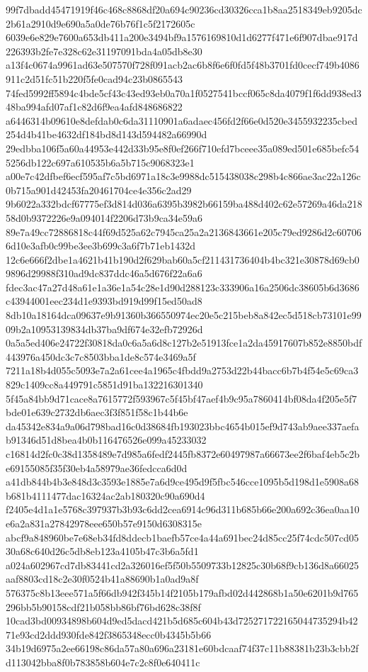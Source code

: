 \documentclass[11pt,a4paper]{article}
\begin{document}
{99f7dbadd45471919f46c468c8868df20a694c90236cd30326cca1b8aa2518349eb9205dc2b61a2910d9e690a5a0de76b76f1c5f2172605c
6039e6e829e7600a653db411a200e3494bf9a1576169810d1d6277f471e6f907dbae917d226393b2fe7e328c62e31197091bda4a05db8e30
a13f4c0674a9961ad63e507570f728f091acb2ac6b8f6e6f0fd5f48b3701fd0cecf749b4086911c2d51fc51b220f5fe0cad94c23b0865543
74fed5992ff5894c4bde5cf43c43ed93eb0a70a1f0527541bccf065c8da4079f1f6dd938ed348ba994afd07af1c82d6f9ea4afd848686822
a6446314b09610e8defdab0c6da31110901a6adaec456fd2f66e0d520e3455932235cbed254d4b41be4632df184bd8d143d594482a66990d
29edbba106f5a60a44953e442d33b95e8f0ef266f710efd7bceee35a089ed501e685befc545256db122c697a610535b6a5b715c9068323e1
a00e7c42dfbef6ecf595af7c5bd6971a18c3e9988dc515438038c298b4c866ae3ac22a126c0b715a901d42453fa20461704ce4e356c2ad29
9b6022a332bdcf67775ef3d814d036a6395b3982b66159ba488d402c62e57269a46da21858d0b9372226e9a094014f2206d73b9ca34e59a6
89e7a49cc72886818c44f69d525a62c7945ca25a2a2136843661e205c79ed9286d2c607066d10e3afb0c99be3ee3b699c3a6f7b71eb1432d
12c6e666f2dbe1a4621b41b190d2f629bab60a5cf211431736404b4bc321e30878d69cb09896d29988f310ad9dc837ddc46a5d676f22a6a6
fdec3ac47a27d48a61e1a36e1a54c28e1d90d288123c333906a16a2506dc38605b6d3686c43944001eec234d1e9393bd919d99f15ed50ad8
8db10a18164dca09637e9b91360b366550974ec20e5c215beb8a842ec5d518cb73101e9909b2a10953139834db37ba9df674e32efb72926d
0a5a5ed406e24722f30818da0c6a5a6d8c127b2e51913fce1a2da45917607b852e8850bdf443976a450dc3c7c8503bba1de8c574e3469a5f
7211a18b4d055c5093e7a2a61cee4a1965c4fbdd9a2753d22b44bacc6b7b4f54e5c69ca3829c1409cc8a449791c5851d91ba132216301340
5f45a84bb9d71cace8a7615772f593967c5f45bf47aef4b9c95a7860414bf08da4f205e5f7bde01e639c2732db6aec3f3f851f58c1b44b6e
da45342e834a9a06d798bad16c0d38684fb193023bbc4654b015ef9d743ab9aee337aefab91346d51d8bea4b0b116476526e099a45233032
c16814d2fc0c38d1358489e7d985a6fedf2445fb8372e60497987a66673ee2f6baf4eb5c2be69155085f35f30eb4a58979ae36fedcca6d0d
a41db844b4b3e848d3c3593e1885e7a6d9ce495d9f5fbc546cce1095b5d198d1e5908a68b681b4111477dac16324ac2ab180320c90a690d4
f2405e4d1a1e5768c397937b3b93c6dd2cea6914c96d311b685b66e200a692c36ea0aa10e6a2a831a27842978eee650b57e9150d6308315e
abcf9a848960be7e68eb34fd8ddecb1baefb57ce4a44a691bec24d85cc25f74cdc507cd0530a68c640d26c5db8eb123a4105b47c3b6a5fd1
a024a602967cd7db83441cd2a326016ef5f50b5509733b12825c30b68f9cb136d8a66025aaf8803cd18c2e30f0524b41a88690b1a0ad9a8f
576375c8b13eee571a5f66db942f345b14f2105b179afbd02d442868b1a50e6201b9d765296bb5b90158cdf21b058bb86bf76bd628c38f8f
10cad3bd00934898b604d9ed5dacd421b5d685c604b43d725271722165044735294b4271e93cd2ddd930fde842f3865348ecc0b4345b5b66
34b19d6975a2ee66198c86da57a80a696a23181e60bdcaaf74f37c11b88381b23b3cbb2fd113042bba8f0b783858b604e7c2c8f0e640411c
}
\end{document}
